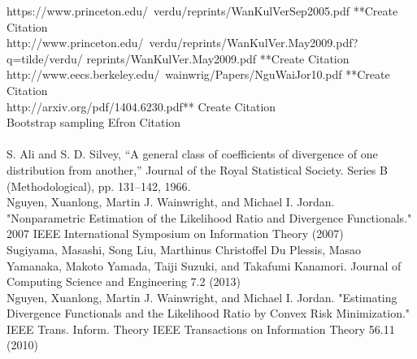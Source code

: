\documentclass{article}
\begin{document}
	\noindent [11] https://www.princeton.edu/~verdu/reprints/WanKulVerSep2005.pdf **Create Citation
	\\ [0.5ex]
	\noindent [12] http://www.princeton.edu/~verdu/reprints/WanKulVer.May2009.pdf?q=tilde/verdu/
	reprints/WanKulVer.May2009.pdf **Create Citation
	\\ [0.5ex]
	
	\noindent [13] http://www.eecs.berkeley.edu/~wainwrig/Papers/NguWaiJor10.pdf **Create Citation
	\\ [0.5ex]
	

	
	\noindent [16] http://arxiv.org/pdf/1404.6230.pdf** Create Citation
	\\ [0.5ex]
	
	\noindent [17] Bootstrap sampling Efron Citation
	\\ [0.5ex]
	
	\noindent [18]
	\\ [0.5ex]
	
	\noindent [19]S. Ali and S. D. Silvey, “A general class of coefficients of divergence of one distribution from another,” Journal of the Royal Statistical Society.
	Series B (Methodological), pp. 131–142, 1966.
	\\ [0.5ex]
	
	\noindent [20] Nguyen, Xuanlong, Martin J. Wainwright, and Michael I. Jordan. "Nonparametric Estimation of the Likelihood Ratio and Divergence Functionals." 2007 IEEE International Symposium on Information Theory (2007)
	\\ [0.5ex]

	\noindent [21] Sugiyama, Masashi, Song Liu, Marthinus Christoffel Du Plessis, Masao Yamanaka, Makoto Yamada, Taiji Suzuki, and Takafumi Kanamori. Journal of Computing Science and Engineering 7.2 (2013)
	\\ [0.5ex]
	
	\noindent [22] Nguyen, Xuanlong, Martin J. Wainwright, and Michael I. Jordan. "Estimating Divergence Functionals and the Likelihood Ratio by Convex Risk Minimization." IEEE Trans. Inform. Theory IEEE Transactions on Information Theory 56.11 (2010)
	\\ [0.5ex]
	
\end{document}
